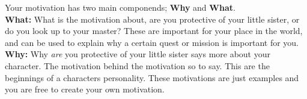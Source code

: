 
Your motivation has two main componends; \textbf{Why} and \textbf{What}.\\
\textbf{What:} What is the motivation about, are you protective of your little sister, or do you look up to your master? These are important for your place in the world, and can be used to explain why a certain quest or mission is important for you.
\textbf{Why:} Why \textit{are} you protective of your little sister says more about your character. The motivation behind the motivation so to say. This are the beginnings of a characters personality.
These motivations are just examples and you are free to create your own motivation.

